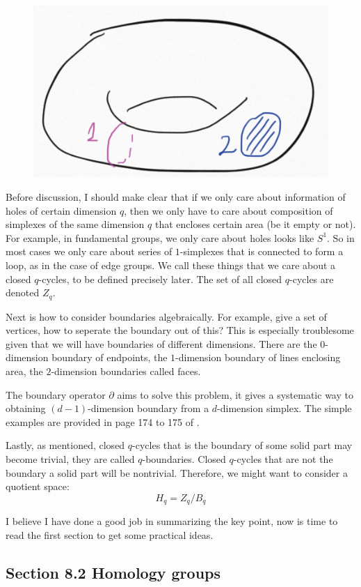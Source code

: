 \begin{figure}[H]
    \centering
    \includegraphics[width=0.6\linewidth]{pics/ch8/torus-p1.png}
\end{figure}

Before discussion, I should make clear that if we only care about
information of holes of certain dimension $q$, then we only have to care
about composition of simplexes of the same dimension $q$ that encloses
certain area (be it empty or not). For example, in fundamental groups,
we only care about holes looks like $S^1$. So in most cases we only
care about series of $1$-simplexes that is connected to form a loop,
as in the case of edge groups. We call these things that we care about
a closed $q$-cycles, to be defined precisely later.  The set of all
closed $q$-cycles are denoted $Z_q$.

Next is how to consider boundaries algebraically. For example, give a
set of vertices, how to seperate the boundary out of this? This is
especially troublesome given that we will have boundaries of different
dimensions. There are the $0$-dimension boundary of endpoints, the
$1$-dimension boundary of lines enclosing area, the $2$-dimension
boundaries called faces. 

The boundary operator $\partial$ aims to solve this problem, it gives
a systematic way to obtaining $(d-1)$-dimension boundary from a
$d$-dimension simplex. The simple examples are provided in page 174 to
175 of \cite{book}.

Lastly, as mentioned, closed $q$-cycles that is the boundary of some
solid part may become trivial, they are called $q$-boundaries. Closed
$q$-cycles that are not the boundary a solid part will be nontrivial.
Therefore, we might want to consider a quotient space:
$$ H_q = Z_q/B_q$$

I believe I have done a good job in summarizing the key point, now is
time to read the first section to get some practical ideas.

\subsection{Section 8.2 Homology groups}
\label{sec:Homology-groups}

